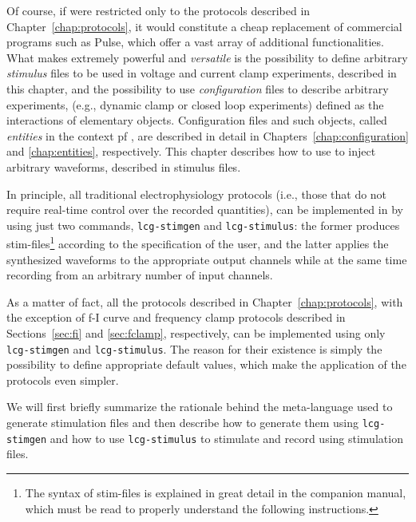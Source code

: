 Of course, if \progname were restricted only to the protocols
described in Chapter~\ref{chap:protocols}, it would constitute a
cheap replacement of commercial programs such as Pulse, which offer a
vast array of additional functionalities. What makes \progname
extremely powerful and \emph{versatile} is the possibility to define
arbitrary \emph{stimulus} files to be used in voltage and current
clamp experiments, described in this chapter, and the possibility to
use \emph{configuration} files to describe arbitrary experiments,
(e.g., dynamic clamp or closed loop experiments) defined as the
interactions of elementary objects. Configuration files and such
objects, called \emph{entities} in the context pf \progname, are
described in detail in Chapters~\ref{chap:configuration} and
\ref{chap:entities}, respectively. This chapter describes how to use
\progname to inject arbitrary waveforms, described in stimulus files.

In principle, all traditional electrophysiology protocols (i.e., those
that do not require real-time control over the recorded quantities),
can be implemented in \progname by using just two commands,
\verb+lcg-stimgen+ and \verb+lcg-stimulus+: the former produces
stim-files\footnote{The syntax of stim-files is explained in great
  detail in the companion manual, which must be read to properly
  understand the following instructions.} according to the
specification of the user, and the
latter applies the synthesized waveforms to the appropriate output
channels while at the same time recording from an arbitrary number of
input channels. 

As a matter of fact, all the protocols described in
Chapter~\ref{chap:protocols}, with the exception of f-I
curve and frequency clamp protocols described in Sections~\ref{sec:fi}
and \ref{sec:fclamp}, respectively, can be implemented using only
\verb+lcg-stimgen+ and \verb+lcg-stimulus+. The reason for their
existence is simply the possibility to define appropriate default
values, which make the application of the protocols even simpler.

We will first briefly summarize the rationale behind the meta-language
used to generate stimulation files and then describe how to generate
them using \verb+lcg-stimgen+ and how to use \verb+lcg-stimulus+ to
stimulate and record using stimulation files.

